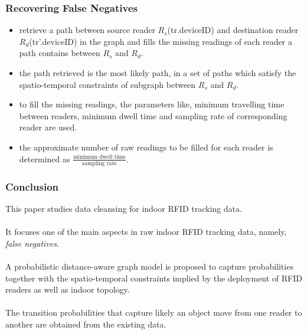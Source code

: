 
\begin{frame}
\frametitle{Recovering False Negatives}

\begin{itemize}

  \item retrieve a path between source reader $R_s$(tr.deviceID) and destination reader $R_d$(tr'.deviceID) in the graph and fills the missing readings of each reader a path contains between $R_s$ and $R_d$.

  \item the path retrieved is the most likely path, in a set of paths which satisfy the spatio-temporal constraints of subgraph between $R_s$ and $R_d$.

  \item to fill the missing readings, the parameters like, minimum travelling time between readers, minimum dwell time and sampling rate of corresponding reader are used.

  \item the approximate number of raw readings to be filled for each reader is determined as $\frac{\text{minimum dwell time}}{\text{sampling rate}}$.

\end{itemize}

\end{frame}


\begin{frame}
\frametitle{Conclusion}

This paper studies data cleansing for indoor RFID tracking data.\\~\\

It focuses one of the main aspects in raw indoor RFID tracking data, namely, \emph{false negatives}.\\~\\

A probabilistic distance-aware graph model is proposed to capture probabilities together with the spatio-temporal constraints implied by the deployment of RFID readers as well as indoor topology.\\~\\

The transition probabilities that capture likely an object move from one reader to another are obtained from the existing data.

\end{frame}
